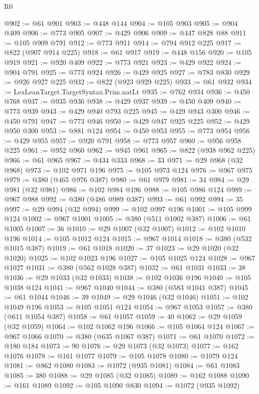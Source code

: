\begin{lexlean}{R0}
\begin{coremodule}
{{{{{{{{{{{{{{{{{{{{{{{{{{{{{{{{{{{{{{{{{{{{{{{{{{{{{{{{{{{{{{{{{{{{{{{{{{{{{{{{{{{{{{@902 := @61 @901
@903 := @448 @144
@904 := @105 @903
@905 := @904 @409
@906 := @773 @905
@907 := @429 @906
@909 := @447 @828 @88
@911 := @105 @909 @791
@912 := @773 @911
@914 := @794 @912 @225
@917 := @822 (@907 @914 @225)
@918 := @61 @917
@919 := @448 @156
@920 := @105 @919
@921 := @920 @409
@922 := @773 @921
@923 := @429 @922
@924 := @904 @791
@925 := @773 @924
@926 := @429 @925
@927 := @783 @830
@929 := @926 @927 @225
@932 := @822 (@923 @929 @225)
@933 := @61 @932
@934 := LexLeanTarget.TargetSyntax.Prim.natLt
@935 := @762 @934
@936 := @450 @768
@937 := @935 @936
@938 := @429 @937
@939 := @450 @409
@940 := @773 @939
@943 := @429 @940 @793 @225
@945 := @429 @943 @300
@946 := @450 @791
@947 := @773 @946
@950 := @429 @947 @925 @225
@952 := @429 @950 @300
@953 := @881 @124
@954 := @450 @953
@955 := @773 @954
@956 := @429 @955
@957 := @920 @791
@958 := @773 @957
@960 := @956 @958 @225
@961 := @952 @960
@962 := @945 @961
@965 := @822 (@938 @962 @225)
@966 := @61 @965
@967 := @434 @333
@968 := 33
@971 := @29 @968 (@32 @968)
@973 := @102 @971 @196
@975 := @105 @973 @124
@976 := @967 @975
@979 := @380 (@465 @976 @387)
@980 := @61 @979
@981 := 34
@984 := @29 @981 (@32 @981)
@986 := @102 @984 @196
@988 := @105 @986 @124
@989 := @967 @988
@992 := @380 (@486 @989 @387)
@993 := @61 @992
@994 := 35
@997 := @29 @994 (@32 @994)
@999 := @102 @997 @196
@1001 := @105 @999 @124
@1002 := @967 @1001
@1005 := @380 (@511 @1002 @387)
@1006 := @61 @1005
@1007 := 36
@1010 := @29 @1007 (@32 @1007)
@1012 := @102 @1010 @196
@1014 := @105 @1012 @124
@1015 := @967 @1014
@1018 := @380 (@532 @1015 @387)
@1019 := @61 @1018
@1020 := 37
@1023 := @29 @1020 (@32 @1020)
@1025 := @102 @1023 @196
@1027 := @105 @1025 @124
@1028 := @967 @1027
@1031 := @380 (@562 @1028 @387)
@1032 := @61 @1031
@1033 := 38
@1036 := @29 @1033 (@32 @1033)
@1038 := @102 @1036 @196
@1040 := @105 @1038 @124
@1041 := @967 @1040
@1044 := @380 (@583 @1041 @387)
@1045 := @61 @1044
@1046 := 39
@1049 := @29 @1046 (@32 @1046)
@1051 := @102 @1049 @196
@1053 := @105 @1051 @124
@1054 := @967 @1053
@1057 := @380 (@611 @1054 @387)
@1058 := @61 @1057
@1059 := 40
@1062 := @29 @1059 (@32 @1059)
@1064 := @102 @1062 @196
@1066 := @105 @1064 @124
@1067 := @967 @1066
@1070 := @380 (@635 @1067 @387)
@1071 := @61 @1070
@1072 := @180 @184
@1073 := 90
@1076 := @29 @1073 (@32 @1073)
@1077 := @162 @1076
@1078 := @161 @1077
@1079 := @105 @1078
@1080 := @1079 @124
@1081 := @862 @1080
@1083 := @1072 (@935 @1081)
@1084 := @61 @1083
@1085 := 380
@1088 := @29 @1085 (@32 @1085)
@1089 := @162 @1088
@1090 := @161 @1089
@1092 := @105 @1090 @830
@1094 := @1072 (@935 @1092)
}}}}}}}}}}}}}}}}}}}}}}}}}}}}}}}}}}}}}}}}}}}}}}}}}}}}}}}}}}}}}}}}}}}}}}}}}}}}}}}}}}}}}}
\end{coremodule}
\end{lexlean}

